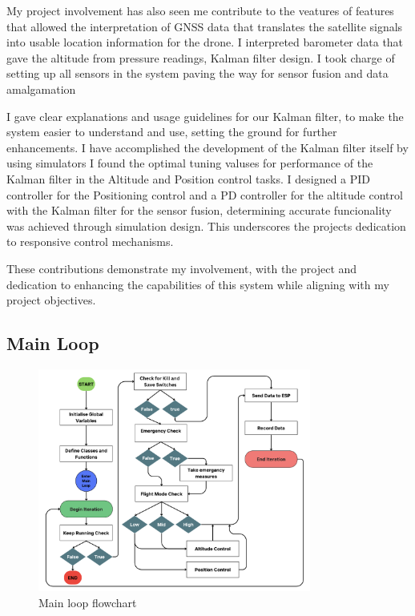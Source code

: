 \documentclass{article}
\begin{document}
My project involvement has also seen me contribute to the veatures of features
that allowed the interpretation of GNSS data that translates the satellite
signals into usable location information for the drone. I interpreted barometer
data that gave the altitude from pressure readings, Kalman filter design. I took
charge of setting up all sensors in the system paving the way for sensor fusion
and data amalgamation

I gave clear explanations and usage guidelines for our Kalman filter, to make
the system easier to understand and use, setting the ground for further
enhancements. I have accomplished the development of the Kalman filter itself by
using simulators I found the optimal tuning valuses for performance of the
Kalman filter in the Altitude and Position control tasks. I designed a PID
controller for the Positioning control and a PD controller for the altitude
control with the Kalman filter for the sensor fusion, determining accurate
funcionality was achieved through simulation design. This underscores the
projects dedication to responsive control mechanisms.

These contributions demonstrate my involvement, with the project and dedication
to enhancing the capabilities of this system while aligning with my project
objectives.

\subsection{Main Loop}
\begin{figure}[H]
  \centering
  \includegraphics[width=0.8\textwidth]{Pictures/main_loop_flowchart.png}
  \caption{Main loop flowchart}
  \label{fig:main_loop_flowchart}
\end{figure}
\end{document}
